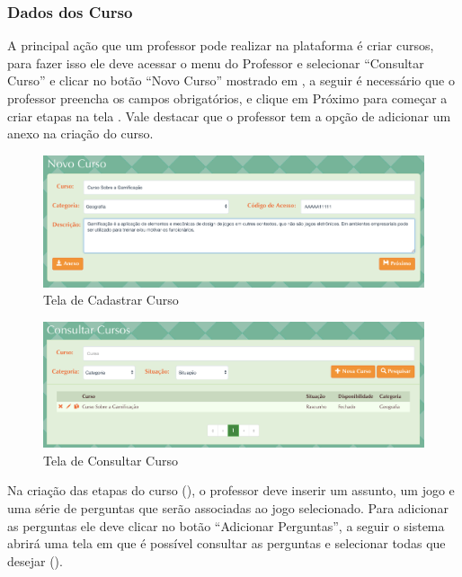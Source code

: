\subsubsection{Dados dos Curso}

A principal ação que um professor pode realizar na plataforma é criar cursos, para fazer isso ele deve acessar o menu do Professor e selecionar “Consultar Curso” e clicar no botão “Novo Curso” mostrado em , a seguir é necessário que o professor preencha os campos obrigatórios, e clique em Próximo para começar a criar etapas na tela . Vale destacar que o professor tem a opção de adicionar um anexo na criação do curso.

\begin{figure}[H]
  \centering
  \includegraphics[scale=0.4]{images/proposta-img/Figura4-28.png}
  \caption{Tela de Cadastrar Curso}
  \label{fig:Figura4-28}
\end{figure}

\begin{figure}[H]
  \centering
  \includegraphics[scale=0.45]{images/proposta-img/Figura4-29.png}
  \caption{Tela de Consultar Curso}
  \label{fig:Figura4-29}
\end{figure}

Na criação das etapas do curso (), o professor deve inserir um assunto, um jogo e uma série de perguntas que serão associadas ao jogo selecionado. Para adicionar as perguntas ele deve clicar no botão “Adicionar Perguntas”, a seguir o sistema abrirá uma tela em que é possível consultar as perguntas e selecionar todas que desejar ().

